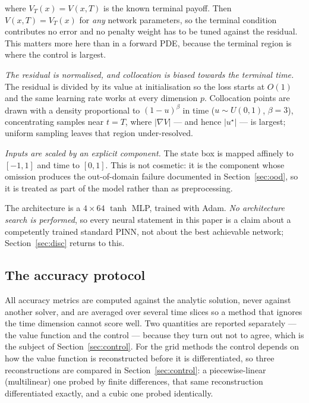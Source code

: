 \documentclass[conference]{IEEEtran}
\begin{document}
where $V_T(x)=V(x,T)$ is the known terminal payoff. Then $V(x,T)=V_T(x)$ for \emph{any} network
parameters, so the terminal condition contributes no error and no penalty weight has to be tuned
against the residual. This matters more here than in a forward PDE, because the terminal region is
where the control is largest.

\emph{The residual is normalised, and collocation is biased towards the terminal time.} The
residual is divided by its value at initialisation so the loss starts at $O(1)$ and the same
learning rate works at every dimension $p$. Collocation points are drawn with a density
proportional to $(1-u)^{\beta}$ in time ($u\sim U(0,1)$, $\beta=3$), concentrating samples near
$t=T$, where $|\nabla V|$ --- and hence $|u^\star|$ --- is largest; uniform sampling leaves that
region under-resolved.

\emph{Inputs are scaled by an explicit component.} The state box is mapped affinely to $[-1,1]$
and time to $[0,1]$. This is not cosmetic: it is the component whose omission produces the
out-of-domain failure documented in Section~\ref{sec:ood}, so it is treated as part of the model
rather than as preprocessing.

The architecture is a $4\times64$ $\tanh$ MLP, trained with Adam. \emph{No architecture search is
performed}, so every neural statement in this paper is a claim about a competently trained
standard PINN, not about the best achievable network; Section~\ref{sec:disc} returns to this.

\subsection{The accuracy protocol}
All accuracy metrics are computed against the analytic solution, never against another solver, and
are averaged over several time slices so a method that ignores the time dimension cannot score
well. Two quantities are reported separately --- the value function and the control --- because
they turn out not to agree, which is the subject of Section~\ref{sec:control}. For the grid
methods the control depends on how the value function is reconstructed before it is
differentiated, so three reconstructions are compared in Section~\ref{sec:control}: a
piecewise-linear (multilinear) one probed by finite differences, that same reconstruction
differentiated exactly, and a cubic one probed identically.
\end{document}
